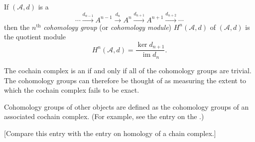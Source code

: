 \documentclass[12pt]{article}
\DeclareMathOperator{\im}{im}
\begin{document}

If $(\mathcal{A},d)$ is a 
\[
  \cdots \xrightarrow{d_{n-1}} A^{n-1} \xrightarrow{d_{n}} A^n \xrightarrow {d_{n+1}}  
      A^{n+1} \xrightarrow{d_{n+2}} \cdots
\]
then the $n^{\mathrm{th}}$ \emph{cohomology group} (or \emph{cohomology module})
$H^n(\mathcal{A},d)$ of $(\mathcal{A},d)$
is the quotient module
\[
 H^n(\mathcal{A},d)=\frac{\ker d_{n+1}}{\im d_n}.
\]

The cochain complex is an  if and only if
all of the cohomology groups are trivial.
The cohomology groups can therefore be thought of
as measuring the extent to which the cochain complex fails to be exact.

Cohomology groups of other objects are defined as the cohomology groups of an associated cochain complex. (For example, see the entry on the .)

[Compare this entry with the entry on homology of a chain complex.]
\end{document}
